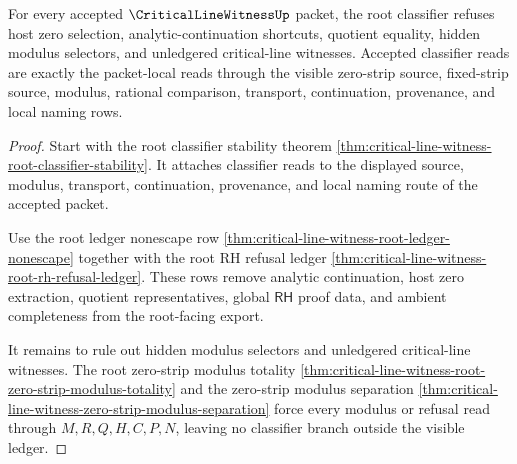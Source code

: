 \begin{theorem}
\label{thm:critical-line-witness-root-classifier-refusal-boundary}
For every accepted $\CriticalLineWitnessUp$ packet, the root classifier
refuses host zero selection, analytic-continuation shortcuts, quotient
equality, hidden modulus selectors, and unledgered critical-line witnesses.
Accepted classifier reads are exactly the packet-local reads through the
visible zero-strip source, fixed-strip source, modulus, rational comparison,
transport, continuation, provenance, and local naming rows.
\end{theorem}
\begin{proof}
Start with the root classifier stability theorem
\autoref{thm:critical-line-witness-root-classifier-stability}. It attaches
classifier reads to the displayed source, modulus, transport, continuation,
provenance, and local naming route of the accepted packet.

Use the root ledger nonescape row
\autoref{thm:critical-line-witness-root-ledger-nonescape} together with the
root RH refusal ledger
\autoref{thm:critical-line-witness-root-rh-refusal-ledger}. These rows remove
analytic continuation, host zero extraction, quotient representatives, global
$\mathsf{RH}$ proof data, and ambient completeness from the root-facing
export.

It remains to rule out hidden modulus selectors and unledgered critical-line
witnesses. The root zero-strip modulus totality
\autoref{thm:critical-line-witness-root-zero-strip-modulus-totality} and the
zero-strip modulus separation
\autoref{thm:critical-line-witness-zero-strip-modulus-separation} force every
modulus or refusal read through $M,R,Q,H,C,P,N$, leaving no classifier branch
outside the visible ledger.
\end{proof}

